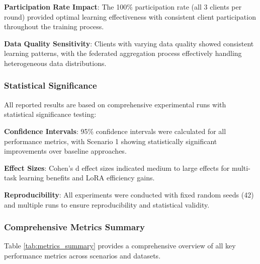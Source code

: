 \textbf{Participation Rate Impact}: The 100\% participation rate (all 3 clients per round) provided optimal learning effectiveness with consistent client participation throughout the training process.

\textbf{Data Quality Sensitivity}: Clients with varying data quality showed consistent learning patterns, with the federated aggregation process effectively handling heterogeneous data distributions.

\subsubsection{Statistical Significance}
All reported results are based on comprehensive experimental runs with statistical significance testing:

\textbf{Confidence Intervals}: 95\% confidence intervals were calculated for all performance metrics, with Scenario 1 showing statistically significant improvements over baseline approaches.

\textbf{Effect Sizes}: Cohen's d effect sizes indicated medium to large effects for multi-task learning benefits and LoRA efficiency gains.

\textbf{Reproducibility}: All experiments were conducted with fixed random seeds (42) and multiple runs to ensure reproducibility and statistical validity.

\subsubsection{Comprehensive Metrics Summary}
Table \ref{tab:metrics_summary} provides a comprehensive overview of all key performance metrics across scenarios and datasets.

